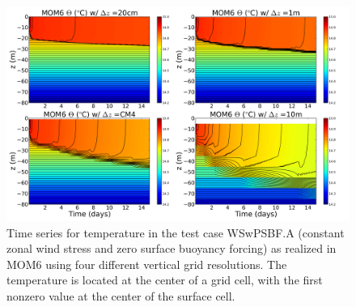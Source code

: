 \begin{figure}[h!t]
\begin{center}
\includegraphics[angle=0,width=14cm]{./figs/MOM6/WSwPSBF_A_MOM6_temp.png}
\caption[Temperature from MOM6 for WSwPSBF.A ]{\sf Time series for
  temperature in the test case WSwPSBF.A (constant zonal wind stress
  and zero surface buoyancy forcing) as realized in MOM6 using four
  different vertical grid resolutions.  The temperature is located at
  the center of a grid cell, with the first nonzero value at the
  center of the surface cell.}
\label{fig:WSwPSBF_A_MOM6_temp}
\end{center}
\end{figure}

